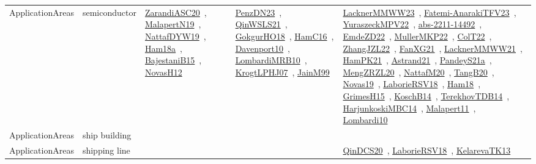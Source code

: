 {\begin{longtable}{lp{3cm}>{\raggedright\arraybackslash}p{6cm}>{\raggedright\arraybackslash}p{6cm}>{\raggedright\arraybackslash}p{8cm}}
ApplicationAreas & semiconductor & \href{works/ZarandiASC20.pdf}{ZarandiASC20}~\cite{ZarandiASC20}, \href{works/MalapertN19.pdf}{MalapertN19}~\cite{MalapertN19}, \href{works/NattafDYW19.pdf}{NattafDYW19}~\cite{NattafDYW19}, \href{works/Ham18a.pdf}{Ham18a}~\cite{Ham18a}, \href{works/BajestaniB15.pdf}{BajestaniB15}~\cite{BajestaniB15}, \href{works/NovasH12.pdf}{NovasH12}~\cite{NovasH12} & \href{works/PenzDN23.pdf}{PenzDN23}~\cite{PenzDN23}, \href{works/QinWSLS21.pdf}{QinWSLS21}~\cite{QinWSLS21}, \href{works/GokgurHO18.pdf}{GokgurHO18}~\cite{GokgurHO18}, \href{works/HamC16.pdf}{HamC16}~\cite{HamC16}, \href{works/Davenport10.pdf}{Davenport10}~\cite{Davenport10}, \href{works/LombardiMRB10.pdf}{LombardiMRB10}~\cite{LombardiMRB10}, \href{works/KrogtLPHJ07.pdf}{KrogtLPHJ07}~\cite{KrogtLPHJ07}, \href{works/JainM99.pdf}{JainM99}~\cite{JainM99} & \href{works/LacknerMMWW23.pdf}{LacknerMMWW23}~\cite{LacknerMMWW23}, \href{works/Fatemi-AnarakiTFV23.pdf}{Fatemi-AnarakiTFV23}~\cite{Fatemi-AnarakiTFV23}, \href{works/YuraszeckMPV22.pdf}{YuraszeckMPV22}~\cite{YuraszeckMPV22}, \href{works/abs-2211-14492.pdf}{abs-2211-14492}~\cite{abs-2211-14492}, \href{works/EmdeZD22.pdf}{EmdeZD22}~\cite{EmdeZD22}, \href{works/MullerMKP22.pdf}{MullerMKP22}~\cite{MullerMKP22}, \href{works/ColT22.pdf}{ColT22}~\cite{ColT22}, \href{works/ZhangJZL22.pdf}{ZhangJZL22}~\cite{ZhangJZL22}, \href{works/FanXG21.pdf}{FanXG21}~\cite{FanXG21}, \href{works/LacknerMMWW21.pdf}{LacknerMMWW21}~\cite{LacknerMMWW21}, \href{works/HamPK21.pdf}{HamPK21}~\cite{HamPK21}, \href{works/Astrand21.pdf}{Astrand21}~\cite{Astrand21}, \href{works/PandeyS21a.pdf}{PandeyS21a}~\cite{PandeyS21a}, \href{works/MengZRZL20.pdf}{MengZRZL20}~\cite{MengZRZL20}, \href{works/NattafM20.pdf}{NattafM20}~\cite{NattafM20}, \href{works/TangB20.pdf}{TangB20}~\cite{TangB20}, \href{works/Novas19.pdf}{Novas19}~\cite{Novas19}, \href{works/LaborieRSV18.pdf}{LaborieRSV18}~\cite{LaborieRSV18}, \href{works/Ham18.pdf}{Ham18}~\cite{Ham18}, \href{works/GrimesH15.pdf}{GrimesH15}~\cite{GrimesH15}, \href{works/KoschB14.pdf}{KoschB14}~\cite{KoschB14}, \href{works/TerekhovTDB14.pdf}{TerekhovTDB14}~\cite{TerekhovTDB14}, \href{works/HarjunkoskiMBC14.pdf}{HarjunkoskiMBC14}~\cite{HarjunkoskiMBC14}, \href{works/Malapert11.pdf}{Malapert11}~\cite{Malapert11}, \href{works/Lombardi10.pdf}{Lombardi10}~\cite{Lombardi10}\\
ApplicationAreas & ship building &  &  & \\
ApplicationAreas & shipping line &  &  & \href{works/QinDCS20.pdf}{QinDCS20}~\cite{QinDCS20}, \href{works/LaborieRSV18.pdf}{LaborieRSV18}~\cite{LaborieRSV18}, \href{works/KelarevaTK13.pdf}{KelarevaTK13}~\cite{KelarevaTK13}\\

\end{longtable}}
